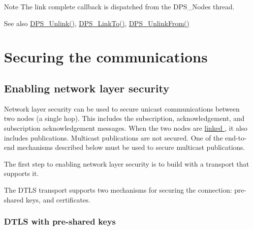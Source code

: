 \begin{DoxyNote}{Note}
The link complete callback is dispatched from the {\ttfamily D\+P\+S\+\_\+\+Node\textquotesingle{}s} thread.
\end{DoxyNote}
\begin{DoxySeeAlso}{See also}
\hyperlink{group__node_ga79c86c3c0c5d6438b953a9acaab0ab0b}{D\+P\+S\+\_\+\+Unlink()}, \hyperlink{group__node_ga0bd13b2bd395bbc7807ecc899a8862f1}{D\+P\+S\+\_\+\+Link\+To()}, \hyperlink{group__node_ga2d5bb0528c2a171991ad6355cbadac69}{D\+P\+S\+\_\+\+Unlink\+From()} 
\end{DoxySeeAlso}
\hypertarget{tutorials-security}{}\section{Securing the communications}\label{tutorials-security}
\hypertarget{tutorials-security_enabling-network-layer-security}{}\subsection{Enabling network layer security}\label{tutorials-security_enabling-network-layer-security}
Network layer security can be used to secure unicast communications between two nodes (a single hop). This includes the subscription, acknowledgement, and subscription acknowledgement messages. When the two nodes are \hyperlink{tutorials-link}{linked }, it also includes publications. Multicast publications are not secured. One of the end-\/to-\/end mechanisms described below must be used to secure multicast publications.

The first step to enabling network layer security is to build with a transport that supports it.




The D\+T\+LS transport supports two mechanisms for securing the connection\+: pre-\/shared keys, and certificates.\hypertarget{tutorials-security_dtls-with-pre-shared-keys}{}\subsubsection{D\+T\+L\+S with pre-\/shared keys}\label{tutorials-security_dtls-with-pre-shared-keys}

